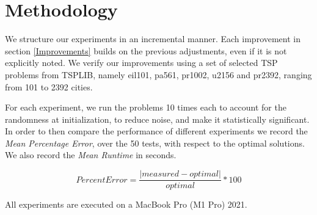 \section{Methodology}
We structure our experiments in an incremental manner.
Each improvement in section \ref{Improvements} builds on the previous adjustments,
even if it is not explicitly noted.
We verify our improvements using a set of selected TSP problems from TSPLIB, namely
eil101, pa561, pr1002, u2156 and pr2392, ranging from 101 to 2392 cities.

For each experiment, we run the problems 10 times each to account for the randomness
at initialization, to reduce noise, and make it statistically significant.
In order to then compare the performance of different experiments
we record the \textit{Mean Percentage Error}, over the 50 tests, with respect to the optimal solutions.
We also record the \textit{Mean Runtime} in seconds.

\begin{equation}
Percent Error= \frac{\lvert measured - optimal\rvert}{optimal}*100
\end{equation}

All experiments are executed on a MacBook Pro (M1 Pro) 2021.